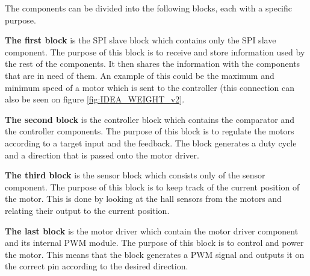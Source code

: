 The components can be divided into the following blocks, each with a specific purpose. 

\textbf{The first block} is the SPI slave block which contains only the SPI slave component. The purpose of this block is to receive and store information used by the rest of the components. It then shares the information with the components that are in need of them. An example of this could be the maximum and minimum speed of a motor which is sent to the controller (this connection can also be seen on figure \ref{fig:IDEA_WEIGHT_v2}.

\textbf{The second block} is the controller block which contains the comparator and the controller components. The purpose of this block is to regulate the motors according to a target input and the feedback. The block generates a duty cycle and a direction that is passed onto the motor driver.

\textbf{The third block} is the sensor block which consists only of the sensor component. The purpose of this block is to keep track of the current position of the motor. This is done by looking at the hall sensors from the motors and relating their output to the current position.

\textbf{The last block} is the motor driver which contain the motor driver component and its internal PWM module. The purpose of this block is to control and power the motor. This means that the block generates a PWM signal and outputs it on the correct pin according to the desired direction.

